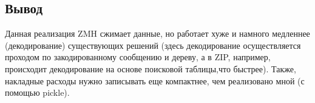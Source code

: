 \subsection*{Вывод}

Данная реализация ZMH сжимает данные, но работает хуже и намного медленнее (декодирование) существующих решений (здесь декодирование осуществляется проходом по закодированному сообщению и дереву, а в ZIP, например,
происходит декодирование на основе поисковой таблицы,что быстрее). Также, накладные расходы нужно записывать еще компактнее, чем реализовано мной (с помощью pickle).

